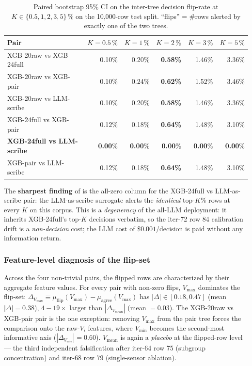 \begin{table}[t]
\centering\small
\caption{Paired bootstrap 95\% CI on the inter-tree decision flip-rate at
$K \in \{0.5, 1, 2, 3, 5\}\,\%$ on the 10,000-row test split.
``flips'' = \#rows alerted by exactly one of the two trees.}
\label{tab:p8-decision-disagreement-flip}
\begin{tabular}{lrrrrr}
\toprule
Pair & $K{=}0.5\,\%$ & $K{=}1\,\%$ & $K{=}2\,\%$ & $K{=}3\,\%$ & $K{=}5\,\%$ \\
\midrule
XGB-20raw vs XGB-24full    & 0.10\% & 0.20\% & \textbf{0.58\%} & 1.46\% & 3.36\% \\
XGB-20raw vs XGB-pair      & 0.10\% & 0.24\% & \textbf{0.62\%} & 1.52\% & 3.46\% \\
XGB-20raw vs LLM-scribe    & 0.10\% & 0.20\% & \textbf{0.58\%} & 1.46\% & 3.36\% \\
XGB-24full vs XGB-pair     & 0.12\% & 0.18\% & \textbf{0.64\%} & 1.48\% & 3.10\% \\
\textbf{XGB-24full vs LLM-scribe}   & \textbf{0.00}\% & \textbf{0.00}\% & \textbf{0.00}\% & \textbf{0.00}\% & \textbf{0.00}\% \\
XGB-pair vs LLM-scribe     & 0.12\% & 0.18\% & \textbf{0.64\%} & 1.48\% & 3.10\% \\
\bottomrule
\end{tabular}
\end{table}

The \textbf{sharpest finding} of 
is the all-zero column for the XGB-24full vs LLM-as-scribe pair:
the LLM-as-scribe surrogate alerts the \emph{identical} top-$K$\%
rows at every $K$ on this corpus. This is a \emph{degeneracy} of
the all-LLM deployment: it inherits XGB-24full's top-$K$ decisions
verbatim, so the iter-72 row 84 calibration drift is a
\emph{non-decision} cost; the LLM cost of $\$0.001$/decision is paid
without any information return.

\subsubsection{Feature-level diagnosis of the flip-set}\label{sec:p8-decision-disagreement-features}

Across the four non-trivial pairs, the flipped rows are characterized
by their aggregate feature values. For every pair with non-zero
flips, $V_\text{max}$ dominates the flip-set: $\Delta_{V_\text{max}}
\equiv \mu_\text{flip}(V_\text{max}) - \mu_\text{agree}(V_\text{max})$
has $|\Delta| \in [0.18, 0.47]$ (mean $|\Delta| = 0.38$), $4{-}19\times$
larger than $|\Delta_{V_\text{mean}}|$ (mean $= 0.03$). The
XGB-20raw vs XGB-pair pair is the one exception: removing
$V_\text{max}$ from the pair tree forces the comparison onto the
raw-$V_i$ features, where $V_\text{min}$ becomes the second-most
informative axis ($|\Delta_{V_\text{min}}| = 0.60$). $V_\text{mean}$
is again a \emph{placebo} at the flipped-row level --- the third
independent falsification after iter-64 row 75 (subgroup
concentration) and iter-68 row 79 (single-sensor ablation).


